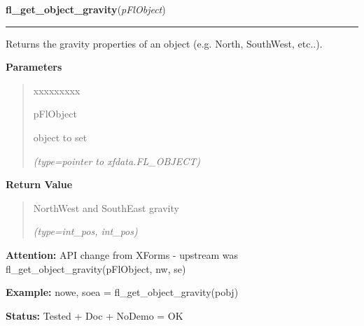     \label{xformslib:flbasic:fl_get_object_gravity}

    \vspace{0.5ex}

\hspace{.8\funcindent}\begin{boxedminipage}{\funcwidth}

    \raggedright \textbf{fl\_get\_object\_gravity}(\textit{pFlObject})

    \vspace{-1.5ex}

    \rule{\textwidth}{0.5\fboxrule}
\setlength{\parskip}{2ex}
    Returns the gravity properties of an object (e.g. North, SouthWest, 
    etc..).

\setlength{\parskip}{1ex}
      \textbf{Parameters}
      \vspace{-1ex}

      \begin{quote}
        \begin{Ventry}{xxxxxxxxx}

          \item[pFlObject]

          object to set

            {\it (type=pointer to xfdata.FL\_OBJECT)}

        \end{Ventry}

      \end{quote}

      \textbf{Return Value}
    \vspace{-1ex}

      \begin{quote}
      NorthWest and SouthEast gravity

      {\it (type=int\_pos, int\_pos)}

      \end{quote}

\textbf{Attention:} API change from XForms - upstream was fl\_get\_object\_gravity(pFlObject, 
nw, se)



\textbf{Example:} nowe, soea = fl\_get\_object\_gravity(pobj)



\textbf{Status:} Tested + Doc + NoDemo = OK



    \end{boxedminipage}

